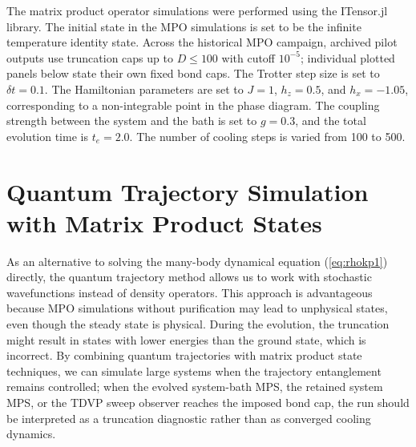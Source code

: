 \documentclass[aps,pra,twocolumn,superscriptaddress,nolongbibliography,nobalancelastpage,10pt]{revtex4-2}
\begin{document}
The matrix product operator simulations were performed using the ITensor.jl~\cite{Fishman2022ITensor} library. The initial state in the MPO simulations is set to be the infinite temperature identity state. Across the historical MPO campaign, archived pilot outputs use truncation caps up to \(D\leq 100\) with cutoff \(10^{-5}\); individual plotted panels below state their own fixed bond caps. The Trotter step size is set to $\delta t = 0.1$. The Hamiltonian parameters are set to $J=1$, $h_z=0.5$, and $h_x=-1.05$, corresponding to a non-integrable point in the phase diagram. The coupling strength between the system and the bath is set to $g=0.3$, and the total evolution time is $t_e=2.0$. The number of cooling steps is varied from 100 to 500.


\section{Quantum Trajectory Simulation with Matrix Product States}

As an alternative to solving the many-body dynamical equation (\ref{eq:rhokp1}) directly, the quantum trajectory method allows us to work with stochastic wavefunctions instead of density operators. This approach is advantageous because MPO simulations without purification may lead to unphysical states, even though the steady state is physical. During the evolution, the truncation might result in states with lower energies than the ground state, which is incorrect. By combining quantum trajectories with matrix product state techniques, we can simulate large systems when the trajectory entanglement remains controlled; when the evolved system-bath MPS, the retained system MPS, or the TDVP sweep observer reaches the imposed bond cap, the run should be interpreted as a truncation diagnostic rather than as converged cooling dynamics.
\end{document}
